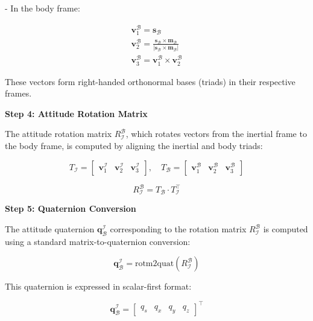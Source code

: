 - In the body frame:

\begin{align}
    \mathbf{v}_1^{\mathcal{B}} = \mathbf{s}_{\mathcal{B}} \\
    \mathbf{v}_2^{\mathcal{B}} = \frac{\mathbf{s}_{\mathcal{B}} \times \mathbf{m}_{\mathcal{B}}}{|\mathbf{s}_{\mathcal{B}} \times \mathbf{m}_{\mathcal{B}}|} \\
    \mathbf{v}_3^{\mathcal{B}} = \mathbf{v}_1^{\mathcal{B}} \times \mathbf{v}_2^{\mathcal{B}}
\end{align}

These vectors form right-handed orthonormal bases (triads) in their respective frames.

\textbf{Step 4: Attitude Rotation Matrix}

The attitude rotation matrix $R_{\mathcal{I}}^{\mathcal{B}}$, which rotates vectors from the inertial frame to the body frame, is computed by aligning the inertial and body triads:

\begin{equation}
    T_{\mathcal{I}} = \begin{bmatrix} \mathbf{v}_1^{\mathcal{I}} & \mathbf{v}_2^{\mathcal{I}} & \mathbf{v}_3^{\mathcal{I}} \end{bmatrix}, \quad
    T_{\mathcal{B}} = \begin{bmatrix} \mathbf{v}_1^{\mathcal{B}} & \mathbf{v}_2^{\mathcal{B}} & \mathbf{v}_3^{\mathcal{B}} \end{bmatrix}
\end{equation}

\begin{equation}
    R_{\mathcal{I}}^{\mathcal{B}} = T_{\mathcal{B}} \cdot T_{\mathcal{I}}^\top
\end{equation}

\textbf{Step 5: Quaternion Conversion}

The attitude quaternion $\mathbf{q}_{\mathcal{B}}^{\mathcal{I}}$ corresponding to the rotation matrix $R_{\mathcal{I}}^{\mathcal{B}}$ is computed using a standard matrix-to-quaternion conversion:

\begin{equation}
    \mathbf{q}_{\mathcal{B}}^{\mathcal{I}} = \text{rotm2quat}(R_{\mathcal{I}}^{\mathcal{B}})
\end{equation}

This quaternion is expressed in scalar-first format:

\begin{equation}
    \mathbf{q}_{\mathcal{B}}^{\mathcal{I}} = \begin{bmatrix} q_s & q_x & q_y & q_z \end{bmatrix}^\top
\end{equation}

